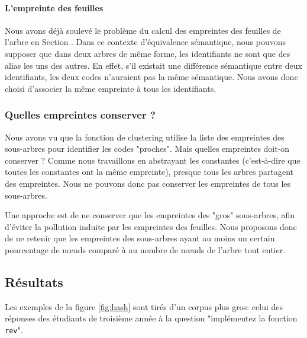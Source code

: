 \paragraph{L'empreinte des feuilles}
Nous avons déjà soulevé le problème du calcul des empreintes des feuilles de l'arbre en Section . Dans ce contexte d'équivalence sémantique, nous pouvons supposer que dans deux arbres de même forme, les identifiants ne sont que des alias les uns des autres. En effet, s'il existait une différence sémantique entre deux identifiants, les deux codes n'auraient pas la même sémantique.
Nous avons donc choisi d'associer la même empreinte à tous les identifiants.

\subsubsection{Quelles empreintes conserver ?}

Nous avons vu que la fonction de clustering utilise la liste des empreintes des sous-arbres pour identifier les codes "proches". Mais quelles empreintes doit-on conserver ? Comme nous travaillons en abstrayant les constantes (c'est-à-dire que toutes les constantes ont la même empreinte), presque tous les arbres partagent des empreintes. Nous ne pouvons donc pas conserver les empreintes de tous les sous-arbres.

Une approche est de ne conserver que les empreintes des "gros" sous-arbres, afin d'éviter la pollution induite par les empreintes des feuilles. Nous proposons donc de ne retenir que les empreintes des sous-arbres ayant au moins un certain pourcentage de nœuds comparé à au nombre de nœuds de l'arbre tout entier.

\subsection{Résultats}

Les exemples de la figure \ref{fig:hash} sont tirés d'un corpus plus gros: celui des réponses des étudiants de troisième année à la question "implémentez la fonction \verb|rev|".

